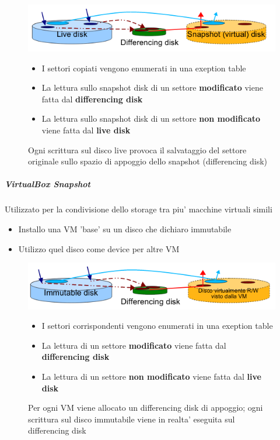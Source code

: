 		\begin{figure}[H]
			\centering
			\includegraphics[scale=0.8]{img/approfondimenti-vbcow.png}
			\caption{Ogni scrittura sul disco live provoca il salvataggio del settore originale 	
			sullo spazio di appoggio dello snapshot (differencing disk) }

			\begin{itemize}
					\item I settori copiati vengono enumerati in una exeption table
					\item La lettura sullo snapshot disk di un settore \textbf{modificato} viene 
					fatta dal \textbf{differencing disk}
					\item La lettura sullo snapshot disk di un settore \textbf{non modificato} 
					viene fatta dal \textbf{live disk}
			\end{itemize}

		\end{figure}
	
	\subparagraph{VirtualBox Snapshot}
		Utilizzato per la condivisione dello storage tra piu' macchine virtuali simili
			\begin{itemize}
				\item Installo una VM 'base' su un disco che dichiaro immutabile
				\item Utilizzo quel disco come device per altre VM						
			\end{itemize}	

			\begin{figure}[H]
				\centering
				\includegraphics[scale=0.8]{img/approfondimenti-vbcow1.png}
				\caption{Per ogni VM viene allocato un differencing disk di appoggio; ogni 
				scrittura sul disco immutabile viene in realta' eseguita sul differencing disk}

				\begin{itemize}
					\item I settori corrispondenti vengono enumerati in una exeption table
					\item La lettura di un settore \textbf{modificato} viene fatta dal 			
					\textbf{differencing disk}
					\item La lettura di un settore \textbf{non modificato}	 
					viene fatta dal \textbf{live disk}
				\end{itemize}

			\end{figure}


